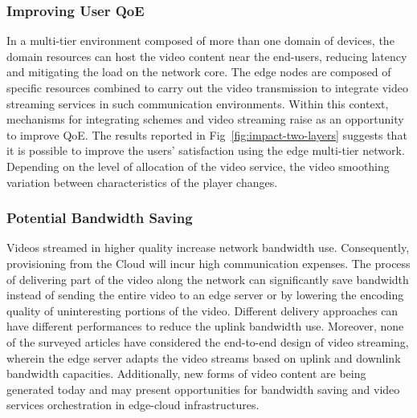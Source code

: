\subsubsection{Improving User QoE}

In a multi-tier environment composed of more than one domain of devices, the domain resources can host the video content near the end-users, reducing latency and mitigating the load on the network core. The edge nodes are composed of specific resources combined to carry out the video transmission to integrate video streaming services in such communication environments. Within this context, mechanisms for integrating schemes and video streaming raise as an opportunity to improve QoE.%
The results reported in Fig~\ref{fig:impact-two-layers} suggests that it is possible to improve the users' satisfaction using the edge multi-tier network. Depending on the level of allocation of the video service, the video smoothing variation between characteristics of the player changes.


\subsubsection{Potential Bandwidth Saving}

Videos streamed in higher quality increase network bandwidth use. Consequently, provisioning from the Cloud will incur high communication expenses. 
The process of delivering part of the video along the network can significantly save bandwidth instead of sending the entire video to an edge server or by lowering the encoding quality of uninteresting portions of the video. Different delivery approaches can have different performances to reduce the uplink bandwidth use. Moreover, none of the surveyed articles have considered the end-to-end design of video streaming, wherein the edge server adapts the video streams based on uplink and downlink bandwidth capacities. Additionally, new forms of video content are being generated today and may present opportunities for bandwidth saving and video services orchestration in edge-cloud infrastructures.


